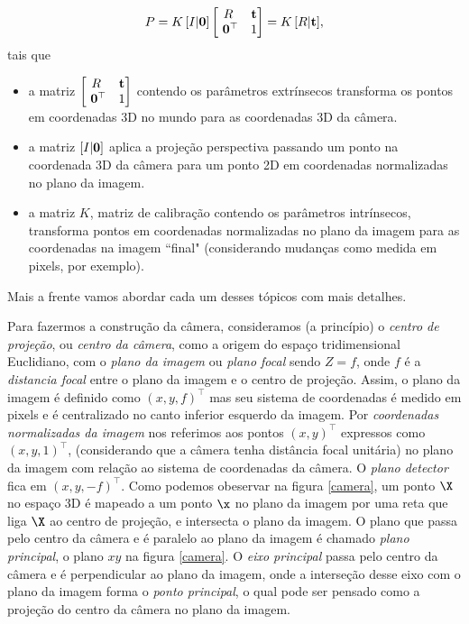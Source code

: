 \begin{equation*}
P = K \, [I|{\bf 0}]
\begin{bmatrix}
R&{\bf t}\\
\,\,{\bf 0}^\top &1
\end{bmatrix}
= K\,[R|{\bf t}],
\end{equation*}
tais que 

\begin{itemize}
\item a matriz $\begin{bmatrix}
R&{\bf t}\\
\,\,{\bf 0}^\top &1
\end{bmatrix}$
contendo os parâmetros extrínsecos transforma os pontos em coordenadas 3D no mundo para as coordenadas 3D da câmera.
\item a matriz $[I|{\bf 0}]$ aplica a projeção perspectiva passando um ponto na coordenada 3D da câmera para um ponto 2D em coordenadas normalizadas no plano da imagem.
\item a matriz $K$, matriz de calibração contendo os parâmetros intrínsecos, transforma pontos em coordenadas normalizadas no plano da imagem para as coordenadas na imagem ``final" (considerando mudanças como medida em pixels, por exemplo).  
\end{itemize}
Mais a frente vamos abordar cada um desses tópicos com mais detalhes.

Para fazermos a construção da câmera, consideramos (a princípio) o \textit{centro de projeção}, ou \textit{centro da câmera}, como a origem do espaço tridimensional Euclidiano, com o \textit{plano da imagem} ou \textit{plano focal} sendo $Z = f$, onde $f$ é a \textit{distancia focal} entre o plano da imagem e o centro de projeção. Assim, o plano da imagem é definido como $(x,y,f)^\top$ mas seu sistema de coordenadas é medido em pixels e é centralizado no canto inferior esquerdo da imagem. Por \textit{coordenadas normalizadas da imagem} nos referimos aos pontos $(x,y)^\top$ expressos como $(x,y,1)^\top$, (considerando que a câmera tenha distância focal unitária) no plano da imagem com relação ao sistema de coordenadas da câmera. O \textit{plano detector} fica em $(x,y,-f)^\top$. Como podemos obeservar na figura \ref{camera}, um ponto $\X$ no espaço 3D é mapeado a um ponto $\x$ no plano da imagem por uma reta que liga $\X$ ao centro de projeção, e intersecta o plano da imagem. O plano que passa pelo centro da câmera e é paralelo ao plano da imagem é chamado \textit{plano principal}, o plano $xy$ na figura \ref{camera}. O \textit{eixo principal} passa pelo centro da câmera e é perpendicular ao plano da imagem, onde a interseção desse eixo com o plano da imagem forma o \textit{ponto principal}, o qual pode ser pensado como a projeção do centro da câmera no plano da imagem.


